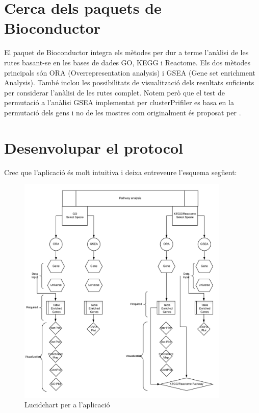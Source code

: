 \section{Cerca dels paquets de Bioconductor}

El paquet  de Bioconductor integra els mètodes per dur a terme l'anàlisi de les rutes basant-se en les bases de dades GO, KEGG i Reactome. Els dos mètodes principals són ORA (Overrepresentation analysis) i GSEA (Gene set enrichment Analysis). També inclou les possibilitats de visualització dels resultats suficients per considerar l'anàlisi de les rutes complet. Notem però que el test de permutació a l'anàlisi GSEA implementat per clusterPrifiler es basa en la permutació dels gens i no de les mostres com originalment és proposat per \cite{subramanian2005gene}.

\section{Desenvolupar el protocol}

Crec que l'aplicació és molt intuitiva i deixa entreveure l'esquema següent:

\begin{figure}[H]
\centering
\includegraphics[width=0.9\textwidth]{LucidChart.png} 
\caption{Lucidchart per a l'aplicació}
\end{figure}

